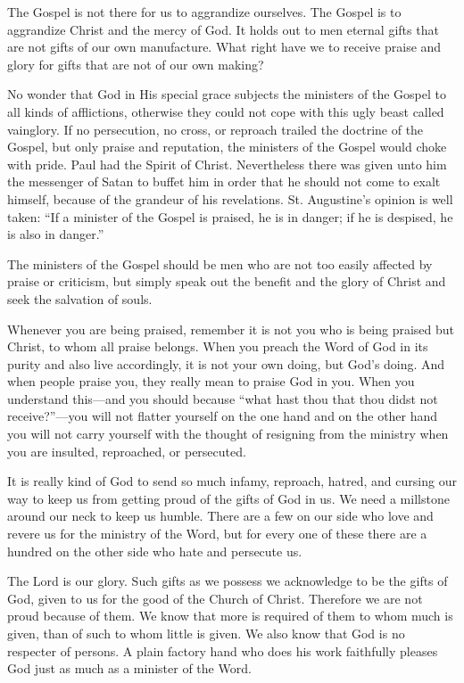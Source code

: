 The Gospel is not there for us to aggrandize ourselves. The Gospel is to aggrandize Christ and the mercy of God. It holds out to men eternal gifts that are not gifts of our own manufacture. What right have we to receive praise and glory for gifts that are not of our own making?

No wonder that God in His special grace subjects the ministers of the Gospel to all kinds of afflictions, otherwise they could not cope with this ugly beast called vainglory. If no persecution, no cross, or reproach trailed the doctrine of the Gospel, but only praise and reputation, the ministers of the Gospel would choke with pride. Paul had the Spirit of Christ. Nevertheless there was given unto him the messenger of Satan to buffet him in order that he should not come to exalt himself, because of the grandeur of his revelations. St. Augustine’s opinion is well taken: “If a minister of the Gospel is praised, he is in danger; if he is despised, he is also in danger.”

The ministers of the Gospel should be men who are not too easily affected by praise or criticism, but simply speak out the benefit and the glory of Christ and seek the salvation of souls.

Whenever you are being praised, remember it is not you who is being praised but Christ, to whom all praise belongs. When you preach the Word of God in its purity and also live accordingly, it is not your own doing, but God’s doing. And when people praise you, they really mean to praise God in you. When you understand this—and you should because “what hast thou that thou didst not receive?”—you will not flatter yourself on the one hand and on the other hand you will not carry yourself with the thought of resigning from the ministry when you are insulted, reproached, or persecuted.

It is really kind of God to send so much infamy, reproach, hatred, and cursing our way to keep us from getting proud of the gifts of God in us. We need a millstone around our neck to keep us humble. There are a few on our side who love and revere us for the ministry of the Word, but for every one of these there are a hundred on the other side who hate and persecute us.

The Lord is our glory. Such gifts as we possess we acknowledge to be the gifts of God, given to us for the good of the Church of Christ. Therefore we are not proud because of them. We know that more is required of them to whom much is given, than of such to whom little is given. We also know that God is no respecter of persons. A plain factory hand who does his work faithfully pleases God just as much as a minister of the Word.


